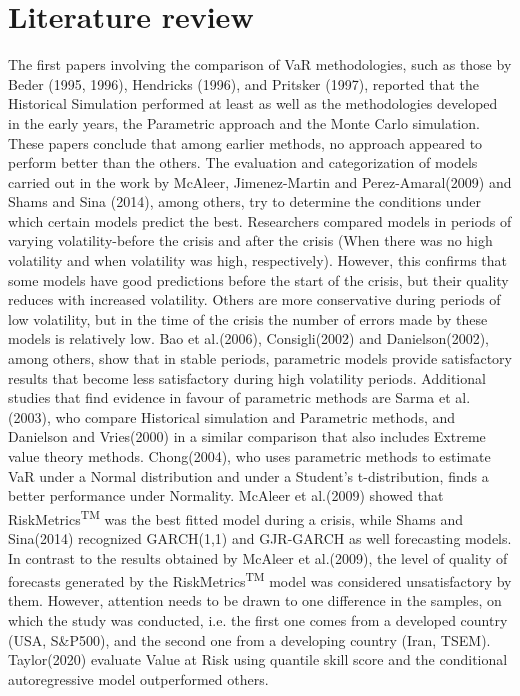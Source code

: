 \documentclass[a4paper,11pt,oneside]{book}
\begin{document}



\section{Literature review}

The first papers involving the comparison of VaR methodologies, such as those by Beder (1995, 1996), Hendricks (1996), and
Pritsker (1997), reported that the Historical Simulation performed at least as well as the methodologies developed in the early years, the Parametric approach and the Monte Carlo simulation. These papers conclude that among earlier methods, no approach appeared to perform better than the
others. The evaluation and categorization of models carried out in the work by McAleer, Jimenez-Martin and Perez-Amaral(2009) and Shams and Sina (2014), among others, try to determine the conditions under which certain models predict the best. Researchers compared models in periods of varying volatility-before the crisis and after the crisis (When there was no high volatility and when volatility was high, respectively). However, this confirms that some models have good predictions before the start of the crisis, but their quality reduces with increased volatility. Others are more conservative during periods of low volatility, but in the time of the crisis the number of errors made by these models is relatively low.
\newline\newline
Bao et al.(2006), Consigli(2002) and Danielson(2002), among
others, show that in stable periods, parametric models provide satisfactory results
that become less satisfactory during high volatility periods.  Additional studies that find
evidence in favour of parametric methods are Sarma et al.(2003), who compare
Historical simulation and Parametric methods, and Danielson and Vries(2000) in a
similar comparison that also includes Extreme value theory methods. Chong(2004),
who uses parametric methods to estimate VaR under a Normal distribution and under a
Student’s t-distribution, finds a better performance under Normality. McAleer et al.(2009) showed that RiskMetrics\textsuperscript{TM} was
the best fitted model during a crisis, while Shams and Sina(2014) recognized GARCH(1,1) and GJR-GARCH as well
forecasting models. In contrast to the results obtained
by McAleer et al.(2009), the level of quality of forecasts
generated by the RiskMetrics\textsuperscript{TM} model was considered
unsatisfactory by them. However, attention needs to be
drawn to one difference in the samples, on which the
study was conducted, i.e. the first one comes from a
developed country (USA, S\&P500), and the second one
from a developing country (Iran, TSEM). Taylor(2020) evaluate Value at Risk using quantile skill score and the conditional autoregressive model outperformed others.
\newline\newline
\end{document}
